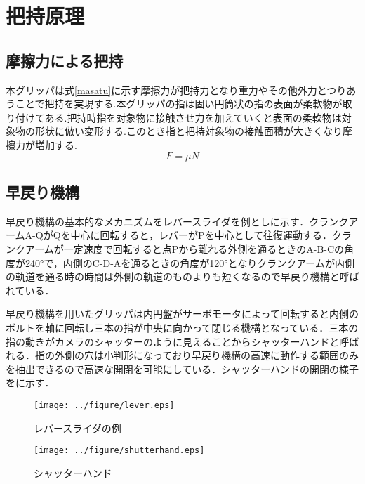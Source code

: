 \section{把持原理}
\subsection{摩擦力による把持}
本グリッパは式\ref{masatu}に示す摩擦力が把持力となり重力やその他外力とつりあうことで把持を実現する.本グリッパの指は固い円筒状の指の表面が柔軟物が取り付けてある.把持時指を対象物に接触させ力を加えていくと表面の柔軟物は対象物の形状に倣い変形する.このとき指と把持対象物の接触面積が大きくなり摩擦力が増加する.
\begin{equation}
    \label{masatu}
    F = μN
\end{equation}
\subsection{早戻り機構}
早戻り機構\cite{hayamodori}の基本的なメカニズムをレバースライダを例としに示す．クランクアームA-QがQを中心に回転すると，レバーがPを中心として往復運動する．クランクアームが一定速度で回転すると点Pから離れる外側を通るときのA-B-Cの角度が240°で，内側のC-D-Aを通るときの角度が120°となりクランクアームが内側の軌道を通る時の時間は外側の軌道のものよりも短くなるので早戻り機構と呼ばれている．\par
早戻り機構を用いたグリッパは内円盤がサーボモータによって回転すると内側のボルトを軸に回転し三本の指が中央に向かって閉じる機構となっている．三本の指の動きがカメラのシャッターのように見えることからシャッターハンドと呼ばれる．指の外側の穴は小判形になっており早戻り機構の高速に動作する範囲のみを抽出できるので高速な開閉を可能にしている．シャッターハンドの開閉の様子をに示す．

\begin{figure}[h]
 \begin{center}
  \texttt{[image: ../figure/lever.eps]}
 \caption{レバースライダの例}
  \label{fig::hayamodori}
 \end{center}
\end{figure}


\begin{figure}[h]
 \begin{center}
  \texttt{[image: ../figure/shutterhand.eps]}
 \caption{シャッターハンド}
  \label{fig::shutter_hand}
 \end{center}
\end{figure}
\newpage

	
